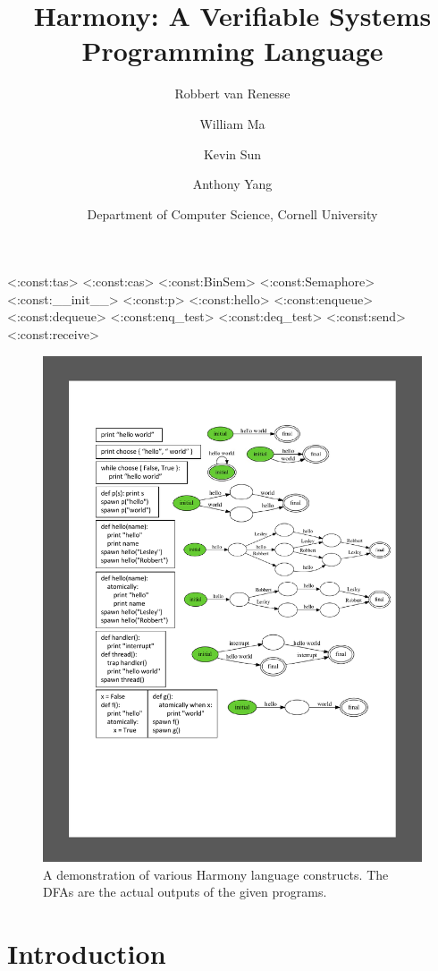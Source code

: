 \documentclass[twocolumn]{article}
\title{Harmony: A Verifiable Systems Programming Language}
\author{Robbert van Renesse \and William Ma \and Kevin Sun \and Anthony Yang}
\date{Department of Computer Science, Cornell University}
\begin{document}
\maketitle

<{:const:tas}>
<{:const:cas}>
<{:const:BinSem}>
<{:const:Semaphore}>
<{:const:__init__}>
<{:const:p}>
<{:const:hello}>
<{:const:enqueue}>
<{:const:dequeue}>
<{:const:enq_test}>
<{:const:deq_test}>
<{:const:send}>
<{:const:receive}>

\begin{figure}
\begin{center}
\includegraphics[width=.9\textwidth]{hello.pdf}
\end{center}
\caption{A demonstration of various Harmony language constructs.  The DFAs
are the actual outputs of the given programs.}
\label{fig:helloworld}
\end{figure}

\section{Introduction}
\end{document}
